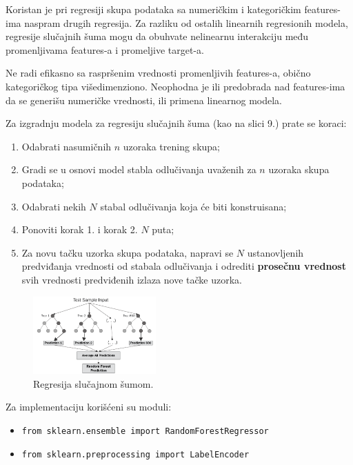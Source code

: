 \documentclass[fontsize=12bp, paper=a4]{scrarticle}
\begin{document}
Koristan je pri regresiji skupa podataka sa numeričkim i kategoričkim features-ima naspram drugih regresija. Za razliku od ostalih linearnih regresionih modela, regresije slučajnih šuma mogu da obuhvate nelinearnu interakciju među promenljivama features-a i promeljive target-a.

Ne radi efikasno sa raspršenim vrednosti promenljivih features-a, obično kategoričkog tipa višedimenziono. Neophodna je ili predobrada nad features-ima da se generišu numeričke vrednosti, ili primena linearnog modela.

Za izgradnju modela za regresiju slučajnih šuma (kao na slici 9.) prate se koraci:
\begin{enumerate}
    \item Odabrati nasumičnih $n$ uzoraka trening skupa;
    \item Gradi se u osnovi model stabla odlučivanja uvaženih za $n$ uzoraka skupa podataka;
    \item Odabrati nekih $N$ stabal odlučivanja koja će biti konstruisana;
    \item Ponoviti korak 1. i korak 2. $N$ puta;
    \item Za novu tačku uzorka skupa podataka, napravi se $N$ ustanovljenih predviđanja vrednosti od stabala odlučivanja i odrediti \textbf{prosečnu vrednost} svih vrednosti predviđenih izlaza nove tačke uzorka.
\end{enumerate}


\begin{figure}[h!]
    \centering
    \includegraphics[width=0.42\textwidth]{9.png}
    \caption{\centering Regresija slučajnom šumom.}
\end{figure}

Za implementaciju korišćeni su moduli:
\begin{itemize}
    \item \verb|from sklearn.ensemble import RandomForestRegressor|
    \item \verb|from sklearn.preprocessing import LabelEncoder|
\end{itemize}
\end{document}

